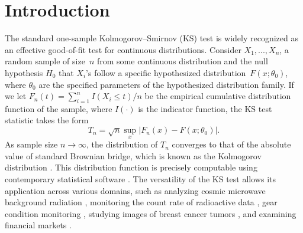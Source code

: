 \documentclass[APA,Times1COL]{WileyNJDv5} %
\begin{document}
\maketitle

\renewcommand\thefootnote{}

\renewcommand\thefootnote{\fnsymbol{footnote}}
\setcounter{footnote}{1}

\section{Introduction}\label{sec:intro}

The standard one-sample Kolmogorov--Smirnov (KS) test is widely
recognized as an effective good-of-fit test for continuous distributions.
Consider $X_1, ..., X_n$, a random sample of size~$n$ from some continuous
distribution and the null hypothesis $H_0$ that $X_i$'s follow a specific
hypothesized distribution~$F(x; \theta_0)$, where $\theta_0$ are the 
specified parameters
of the hypothesized distribution family.
If we let $F_n(t) = \sum_{i=1}^n I(X_i \le t) / n$ be the empirical cumulative
distribution function of the sample, where $I(\cdot)$ is the indicator
function, the KS test statistic takes the form
\begin{equation}
  \label{eq:ks_standard}
  T_n = \sqrt{n} \sup_x | F_{n}(x) - F(x; \theta_0)|.
\end{equation}
As sample size $n\to \infty$, the distribution of $T_n$ converges to that of the
absolute value of standard Brownian bridge, which is known as the Kolmogorov
distribution \citep{stephens1974edf}. This distribution function is
precisely computable using contemporary statistical software
\citep{marsaglia2003evaluating}. The versatility of the KS test allows its
application across various domains, such as analyzing cosmic microwave
background radiation \citep{naess2012application}, monitoring the count rate of
radioactive data \citep{aslam2020introducing}, gear condition monitoring
\citep{andrade2001gear}, studying images of breast cancer tumors
\citep{demidenko2004kolmogorov}, and examining financial markets
\citep{lux2001turbulence}.
\end{document}
